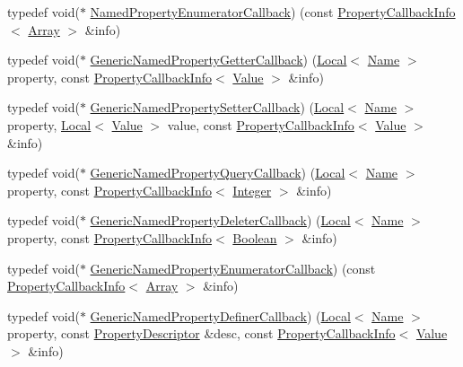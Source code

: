\begin{DoxyCompactItemize}
\item 
typedef void($\ast$ \mbox{\hyperlink{namespacev8_a5f6f16818a9cddacadbfe6d90ca3a6b1}{Named\+Property\+Enumerator\+Callback}}) (const \mbox{\hyperlink{classv8_1_1PropertyCallbackInfo}{Property\+Callback\+Info}}$<$ \mbox{\hyperlink{classv8_1_1Array}{Array}} $>$ \&info)
\item 
typedef void($\ast$ \mbox{\hyperlink{namespacev8_a24b1801fa53a7c5a71366d8044927563}{Generic\+Named\+Property\+Getter\+Callback}}) (\mbox{\hyperlink{classv8_1_1Local}{Local}}$<$ \mbox{\hyperlink{classv8_1_1Name}{Name}} $>$ property, const \mbox{\hyperlink{classv8_1_1PropertyCallbackInfo}{Property\+Callback\+Info}}$<$ \mbox{\hyperlink{classv8_1_1Value}{Value}} $>$ \&info)
\item 
typedef void($\ast$ \mbox{\hyperlink{namespacev8_af74716c6e95a269c6cd4314662fd0a7e}{Generic\+Named\+Property\+Setter\+Callback}}) (\mbox{\hyperlink{classv8_1_1Local}{Local}}$<$ \mbox{\hyperlink{classv8_1_1Name}{Name}} $>$ property, \mbox{\hyperlink{classv8_1_1Local}{Local}}$<$ \mbox{\hyperlink{classv8_1_1Value}{Value}} $>$ value, const \mbox{\hyperlink{classv8_1_1PropertyCallbackInfo}{Property\+Callback\+Info}}$<$ \mbox{\hyperlink{classv8_1_1Value}{Value}} $>$ \&info)
\item 
typedef void($\ast$ \mbox{\hyperlink{namespacev8_add9f7ab11e4a9a2b9ad2c4536b0e1a64}{Generic\+Named\+Property\+Query\+Callback}}) (\mbox{\hyperlink{classv8_1_1Local}{Local}}$<$ \mbox{\hyperlink{classv8_1_1Name}{Name}} $>$ property, const \mbox{\hyperlink{classv8_1_1PropertyCallbackInfo}{Property\+Callback\+Info}}$<$ \mbox{\hyperlink{classv8_1_1Integer}{Integer}} $>$ \&info)
\item 
typedef void($\ast$ \mbox{\hyperlink{namespacev8_ad2aecc0406ea4bc02d5a4f84a433b273}{Generic\+Named\+Property\+Deleter\+Callback}}) (\mbox{\hyperlink{classv8_1_1Local}{Local}}$<$ \mbox{\hyperlink{classv8_1_1Name}{Name}} $>$ property, const \mbox{\hyperlink{classv8_1_1PropertyCallbackInfo}{Property\+Callback\+Info}}$<$ \mbox{\hyperlink{classv8_1_1Boolean}{Boolean}} $>$ \&info)
\item 
typedef void($\ast$ \mbox{\hyperlink{namespacev8_a20826eb7e52e84fa4f632534e8eddd04}{Generic\+Named\+Property\+Enumerator\+Callback}}) (const \mbox{\hyperlink{classv8_1_1PropertyCallbackInfo}{Property\+Callback\+Info}}$<$ \mbox{\hyperlink{classv8_1_1Array}{Array}} $>$ \&info)
\item 
typedef void($\ast$ \mbox{\hyperlink{namespacev8_a66c854bc88d612ab4c65354bc0dc74a0}{Generic\+Named\+Property\+Definer\+Callback}}) (\mbox{\hyperlink{classv8_1_1Local}{Local}}$<$ \mbox{\hyperlink{classv8_1_1Name}{Name}} $>$ property, const \mbox{\hyperlink{classv8_1_1PropertyDescriptor}{Property\+Descriptor}} \&desc, const \mbox{\hyperlink{classv8_1_1PropertyCallbackInfo}{Property\+Callback\+Info}}$<$ \mbox{\hyperlink{classv8_1_1Value}{Value}} $>$ \&info)

\end{DoxyCompactItemize}
